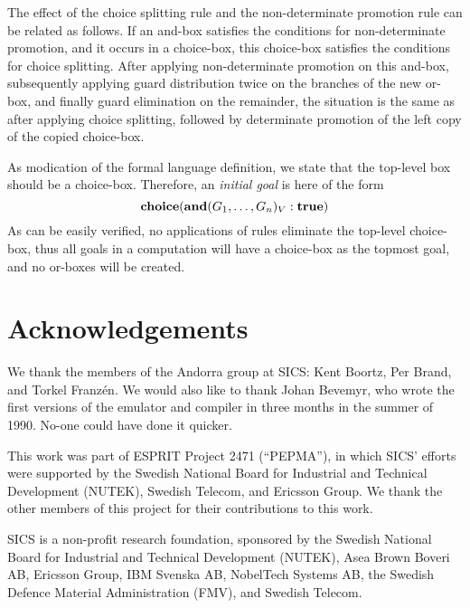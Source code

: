 The effect of the choice splitting rule and the non-determinate
promotion rule can be related as follows.  If an and-box satisfies the
conditions for non-determinate promotion, and it occurs in a
choice-box, this choice-box satisfies the conditions for choice
splitting.  After applying non-determinate promotion on this and-box,
subsequently applying guard distribution twice on the branches of the
new or-box, and finally guard elimination on the remainder, the
situation is the same as after applying choice splitting, followed by
determinate promotion of the left copy of the copied choice-box.

As modication of the formal language definition, we state that the
top-level box should be a choice-box.  Therefore, an {\em initial
goal} is here of the form
%
$$\mbox{\bf choice}(\mbox{\bf and}(G_1, \dots, G_n)_V \mathrel{\mbox{:}} \mbox{\bf true})$$
%
As can be easily verified, no applications of rules eliminate the
top-level choice-box, thus all goals in a computation will have a
choice-box as the topmost goal, and no or-boxes will be created.


\section*{Acknowledgements}

We thank the members of the Andorra group at SICS: Kent Boortz, Per
Brand, and Torkel Franz\'en.  We would also like to thank Johan
Bevemyr, who wrote the first versions of the emulator and compiler in
three months in the summer of 1990.  No-one could have done it
quicker.

This work was part of ESPRIT Project 2471 (``PEPMA''), in which SICS'
efforts were supported by the Swedish National Board for Industrial
and Technical Development (NUTEK), Swedish Telecom, and Ericsson
Group.  We thank the other members of this project for their
contributions to this work.

SICS is a non-profit research foundation, sponsored by the Swedish
National Board for Industrial and Technical Development (NUTEK), Asea
Brown Boveri AB, Ericsson Group, IBM Svenska AB, NobelTech Systems AB,
the Swedish Defence Material Administration (FMV), and Swedish
Telecom.





